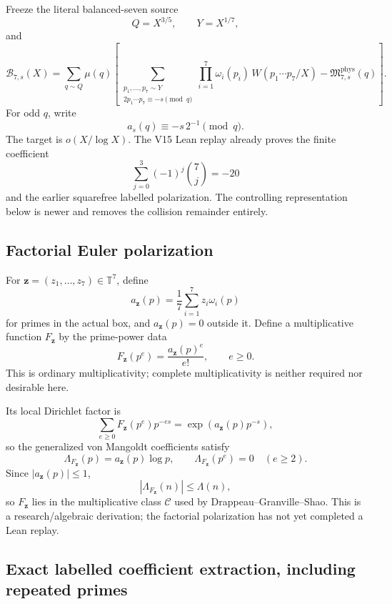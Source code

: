 \documentclass[11pt]{article}
\theoremstyle{definition}
\newcommand{\1}{\mathbf 1}
\newcommand{\B}{\mathcal B}
\begin{document}
{{{Freeze the literal balanced-seven source
\[
Q=X^{3/5},\qquad Y=X^{1/7},
\]
and
\[
\B_{7,s}(X)=
\sum_{q\sim Q}\mu(q)
\left[
\sum_{\substack{p_1,\ldots,p_7\sim Y\\2p_1\cdots p_7\equiv-s\pmod q}}
\prod_{i=1}^7\omega_i(p_i)\,W(p_1\cdots p_7/X)
-\mathfrak M^{\mathrm{phys}}_{7,s}(q)
\right].
\]
For odd $q$, write
\[
 a_s(q)\equiv -s\,2^{-1}\pmod q.
\]
The target is $o(X/\log X)$.  The V15 Lean replay already proves the finite coefficient
\[
\sum_{j=0}^3(-1)^j\binom7j=-20
\]
and the earlier squarefree labelled polarization.  The controlling representation below is
newer and removes the collision remainder entirely.

\subsection{Factorial Euler polarization}

For $\mathbf z=(z_1,\ldots,z_7)\in\mathbb T^7$, define
\[
a_{\mathbf z}(p)=\frac17\sum_{i=1}^7z_i\omega_i(p)
\]
for primes in the actual box, and $a_{\mathbf z}(p)=0$ outside it.  Define a multiplicative
function $F_{\mathbf z}$ by the prime-power data
\[
\boxed{F_{\mathbf z}(p^e)=\frac{a_{\mathbf z}(p)^e}{e!},\qquad e\ge0.}
\]
This is ordinary multiplicativity; complete multiplicativity is neither required nor
desirable here.

Its local Dirichlet factor is
\[
\sum_{e\ge0}F_{\mathbf z}(p^e)p^{-es}
=\exp\!\left(a_{\mathbf z}(p)p^{-s}\right),
\]
so the generalized von Mangoldt coefficients satisfy
\[
\Lambda_{F_{\mathbf z}}(p)=a_{\mathbf z}(p)\log p,\qquad
\Lambda_{F_{\mathbf z}}(p^e)=0\quad(e\ge2).
\]
Since $|a_{\mathbf z}(p)|\le1$,
\[
|\Lambda_{F_{\mathbf z}}(n)|\le\Lambda(n),
\]
so $F_{\mathbf z}$ lies in the multiplicative class $\mathcal C$ used by
Drappeau--Granville--Shao.  This is a research/algebraic derivation; the factorial
polarization has not yet completed a Lean replay.

\subsection{Exact labelled coefficient extraction, including repeated primes}

}}}
\end{document}

